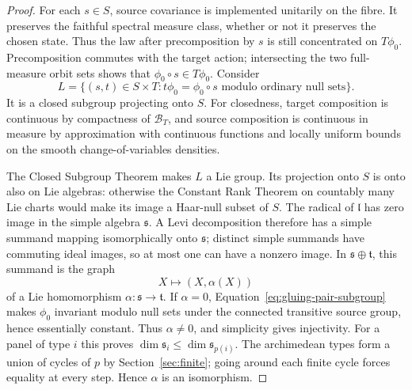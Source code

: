 \begin{proof}
For each $s\in S$, source covariance is implemented unitarily on
the fibre.  It preserves the faithful spectral measure class,
whether or not it preserves the chosen state.  Thus the law
after precomposition by $s$ is still concentrated on
$T\phi_0$.  Precomposition commutes with the target action;
intersecting the two full-measure orbit sets shows that
$\phi_0\circ s\in T\phi_0$.  Consider
\begin{equation}
 \label{eq:gluing-pair-subgroup}
 L=\{(s,t)\in S\times T:
               t\phi_0=\phi_0\circ s
                  \text{ modulo ordinary null sets}\}.
\end{equation}
It is a closed subgroup projecting onto $S$.  For closedness,
target composition is continuous by compactness of
$\mathcal B_T$, and source composition is continuous in measure
by approximation with continuous functions and locally uniform
bounds on the smooth change-of-variables densities.

The Closed Subgroup Theorem makes $L$ a Lie group.  Its
projection onto $S$ is onto also on Lie algebras: otherwise
the Constant Rank Theorem on countably many Lie charts would
make its image a Haar-null subset of $S$.  The radical of
$\mathfrak l$ has zero image in the simple algebra
$\mathfrak s$.  A Levi decomposition \cite[Appendix~B, Theorem~B.2]{Knapp2023}
therefore has a simple summand mapping isomorphically onto $\mathfrak s$; distinct
simple summands have commuting ideal images, so at most one
can have a nonzero image.  In
$\mathfrak s\oplus\mathfrak t$, this summand is the graph
\[
 X\longmapsto (X,\alpha(X))
\]
of a Lie homomorphism $\alpha:\mathfrak s\to\mathfrak t$.
If $\alpha=0$, Equation~\eqref{eq:gluing-pair-subgroup} makes
$\phi_0$ invariant modulo null sets under the connected
transitive source group, hence essentially constant.  Thus
$\alpha\ne0$, and simplicity gives injectivity.  For a panel
of type $i$ this proves
$\dim\mathfrak s_i\le\dim\mathfrak s_{p(i)}$.
The archimedean types form a union of cycles of $p$ by
Section~\ref{sec:finite}; going around each finite cycle forces
equality at every step.  Hence $\alpha$ is an isomorphism.


\end{proof}
